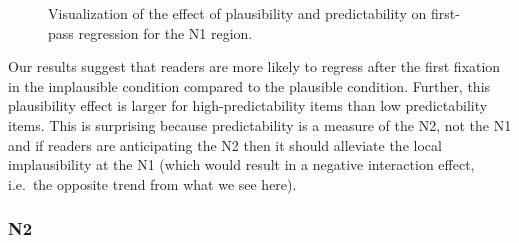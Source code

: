 \documentclass[
  letterpaper,
  DIV=11,
  numbers=noendperiod,
  nottoc]{scrreprt}
\begin{document}
\begin{figure}[htbp]


\caption{\label{fig-firstpassn1}Visualization of the effect of
plausibility and predictability on first-pass regression for the N1
region.}

\end{figure}%

Our results suggest that readers are more likely to regress after the
first fixation in the implausible condition compared to the plausible
condition. Further, this plausibility effect is larger for
high-predictability items than low predictability items. This is
surprising because predictability is a measure of the N2, not the N1 and
if readers are anticipating the N2 then it should alleviate the local
implausibility at the N1 (which would result in a negative interaction
effect, i.e.~the opposite trend from what we see here).

\subsubsection{N2}\label{n2-3}
\end{document}
